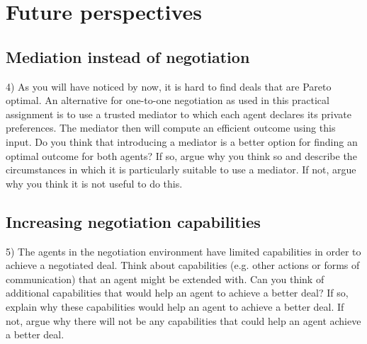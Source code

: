 \chapter{Future perspectives}

\section{Mediation instead of negotiation}
4) As you will have noticed by now, it is hard to find deals that are Pareto optimal. An alternative
for one-to-one negotiation as used in this practical assignment is to use a trusted mediator to which
each agent declares its private preferences. The mediator then will compute an efficient outcome
using this input. Do you think that introducing a mediator is a better option for finding an optimal
outcome for both agents? If so, argue why you think so and describe the circumstances in which it
is particularly suitable to use a mediator. If not, argue why you think it is not useful to do this.

\section{Increasing negotiation capabilities}
5) The agents in the negotiation environment have limited capabilities in order to achieve a negotiated
deal. Think about capabilities (e.g. other actions or forms of communication) that an agent might be
extended with. Can you think of additional capabilities that would help an agent to achieve a better
deal? If so, explain why these capabilities would help an agent to achieve a better deal. If not, argue
why there will not be any capabilities that could help an agent achieve a better deal.